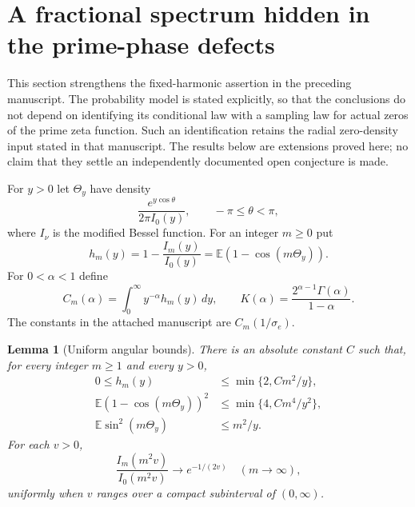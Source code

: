 \documentclass[11pt,a4paper]{article}
\newtheorem{lemma}[theorem]{Lemma}
\theoremstyle{definition}
\theoremstyle{remark}\newtheorem{remark}[theorem]{Remark}
\begin{document}
\section{A fractional spectrum hidden in the prime-phase defects}
\label{sec:fractional-defects}

This section strengthens the fixed-harmonic assertion in the preceding
manuscript.  The probability model is stated explicitly, so that the conclusions
do not depend on identifying its conditional law with a sampling law for actual
zeros of the prime zeta function.  Such an identification retains the radial
zero-density input stated in that manuscript.  The results below are extensions
proved here; no claim that they settle an independently documented open
conjecture is made.

For $y>0$ let $\Theta_y$ have density
\[
 \frac{e^{y\cos\theta}}{2\pi I_0(y)},\qquad -\pi\leq\theta<\pi,
\]
where $I_\nu$ is the modified Bessel function.  For an integer $m\geq0$ put
\[
 h_m(y)=1-\frac{I_m(y)}{I_0(y)}
       =\mathbb E(1-\cos(m\Theta_y)).
\]
For $0<\alpha<1$ define
\begin{equation}\label{eq:new-Cm}
 C_m(\alpha)=\int_0^\infty y^{-\alpha}h_m(y)\,dy,
 \qquad
 K(\alpha)=\frac{2^{\alpha-1}\Gamma(\alpha)}{1-\alpha}.
\end{equation}
The constants in the attached manuscript are $C_m(1/\sigma_e)$.

\begin{lemma}[Uniform angular bounds]\label{lem:new-angular}
There is an absolute constant $C$ such that, for every integer $m\geq1$ and
every $y>0$,
\begin{align}
 0\leq h_m(y)&\leq \min\{2,Cm^2/y\},\label{eq:new-h-bound}\\
 \mathbb E(1-\cos(m\Theta_y))^2
     &\leq \min\{4,Cm^4/y^2\},\label{eq:new-square-bound}\\
 \mathbb E\sin^2(m\Theta_y)&\leq m^2/y.\label{eq:new-sin-bound}
\end{align}
For each $v>0$,
\begin{equation}\label{eq:new-bessel-normal}
 \frac{I_m(m^2v)}{I_0(m^2v)}\longrightarrow e^{-1/(2v)}
 \quad(m\longrightarrow\infty),
\end{equation}
uniformly when $v$ ranges over a compact subinterval of $(0,\infty)$.
\end{lemma}
\end{document}
